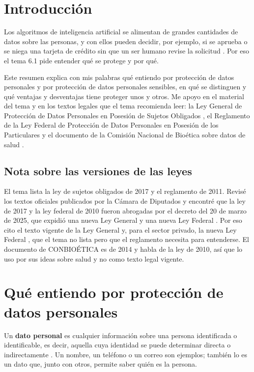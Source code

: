 \documentclass[11pt,letterpaper]{article}
\begin{document}
\portada
\indicegeneral

\section{Introducción}

Los algoritmos de inteligencia artificial se alimentan de grandes cantidades de datos sobre las personas, y con ellos pueden decidir, por ejemplo, si se aprueba o se niega una tarjeta de crédito sin que un ser humano revise la solicitud \parencite{iae_u6_t61}. Por eso el tema 6.1 pide entender qué se protege y por qué.

Este resumen explica con mis palabras qué entiendo por protección de datos personales y por protección de datos personales sensibles, en qué se distinguen y qué ventajas y desventajas tiene proteger unos y otros. Me apoyo en el material del tema \parencite{iae_u6_t61} y en los textos legales que el tema recomienda leer: la Ley General de Protección de Datos Personales en Posesión de Sujetos Obligados \parencite{lgpdppso2025}, el Reglamento de la Ley Federal de Protección de Datos Personales en Posesión de los Particulares \parencite{reglamento2011} y el documento de la Comisión Nacional de Bioética sobre datos de salud \parencite{conbioetica2014}.

\subsection*{Nota sobre las versiones de las leyes}

El tema lista la ley de sujetos obligados de 2017 y el reglamento de 2011. Revisé los textos oficiales publicados por la Cámara de Diputados y encontré que la ley de 2017 y la ley federal de 2010 fueron abrogadas por el decreto del 20 de marzo de 2025, que expidió una nueva Ley General y una nueva Ley Federal \parencite{lgpdppso2025}. Por eso cito el texto vigente de la Ley General \parencite{lgpdppso2025} y, para el sector privado, la nueva Ley Federal \parencite{lfpdppp2025}, que el tema no lista pero que el reglamento necesita para entenderse. El documento de CONBIOÉTICA es de 2014 y habla de la ley de 2010, así que lo uso por sus ideas sobre salud y no como texto legal vigente.

\section{Qué entiendo por protección de datos personales}

Un \textbf{dato personal} es cualquier información sobre una persona identificada o identificable, es decir, aquella cuya identidad se puede determinar directa o indirectamente \parencite[art.~3, fr.~IX]{lgpdppso2025}. Un nombre, un teléfono o un correo son ejemplos; también lo es un dato que, junto con otros, permite saber quién es la persona.
\end{document}
